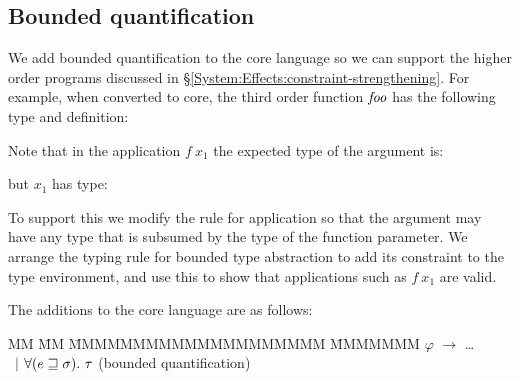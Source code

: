 
\subsection{Bounded quantification}
\label{Core:Extensions:Bounded}

We add bounded quantification to the core language so we can support the higher order programs discussed in \S\ref{System:Effects:constraint-strengthening}. For example, when converted to core, the third order function $\operatorname{\mathit{foo}}$ has the following type and definition:



\vspace{-3ex}

Note that in the application $f \ x_1$ the expected type of the argument is:


but $x_1$ has type:


To support this we modify the rule for application so that the argument may have any type that is subsumed by the type of the function parameter. We arrange the typing rule for bounded type abstraction to add its constraint to the type environment, and use this to show that applications such as $f \ x_1$ are valid.


The additions to the core language are as follows:
\begin{tabbing}
MM 	\= MM \= MMMMMMMMMMMMMMMMMMMM \= MMMMMMM \kill
$\varphi$  
	\> $\to$	\> \dots \\
	\> \ $\mid$	\> $\forall (e \sqsupseteq \sigma ). \ \tau$		\> (bounded quantification) 
\end{tabbing}

